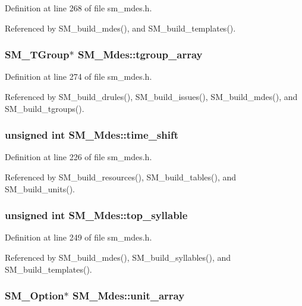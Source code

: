 Definition at line 268 of file sm\_\-mdes.h.

Referenced by SM\_\-build\_\-mdes(), and SM\_\-build\_\-templates().
\subsubsection{\setlength{\rightskip}{0pt plus 5cm}\bf{SM\_\-TGroup}$\ast$ \bf{SM\_\-Mdes::tgroup\_\-array}}\label{structSM__Mdes_490250b9c31286a84b0529728bf318b7}




Definition at line 274 of file sm\_\-mdes.h.

Referenced by SM\_\-build\_\-drules(), SM\_\-build\_\-issues(), SM\_\-build\_\-mdes(), and SM\_\-build\_\-tgroups().
\subsubsection{\setlength{\rightskip}{0pt plus 5cm}unsigned int \bf{SM\_\-Mdes::time\_\-shift}}\label{structSM__Mdes_0ed984bb41422f2e507773d1cf3f50f7}




Definition at line 226 of file sm\_\-mdes.h.

Referenced by SM\_\-build\_\-resources(), SM\_\-build\_\-tables(), and SM\_\-build\_\-units().
\subsubsection{\setlength{\rightskip}{0pt plus 5cm}unsigned int \bf{SM\_\-Mdes::top\_\-syllable}}\label{structSM__Mdes_4df216cc89dc85f2097496da02a1e322}




Definition at line 249 of file sm\_\-mdes.h.

Referenced by SM\_\-build\_\-mdes(), SM\_\-build\_\-syllables(), and SM\_\-build\_\-templates().
\subsubsection{\setlength{\rightskip}{0pt plus 5cm}\bf{SM\_\-Option}$\ast$ \bf{SM\_\-Mdes::unit\_\-array}}\label{structSM__Mdes_2cfe188c493008cff3a6efda8f77aef0}




